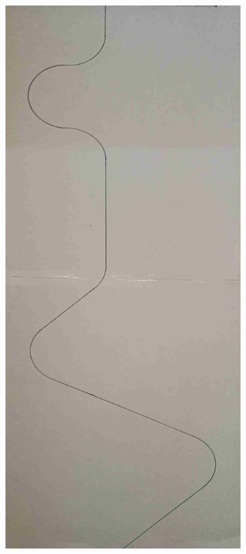 \begin{figure}[H]
    \centering
    \begin{subfigure}[t]{0.5\textwidth}
        \centering
        \includegraphics[scale = 1]{pics/Res5.jpg}

\end{subfigure}
\end{figure}

